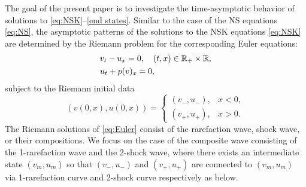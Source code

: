 \documentclass[11pt,reqno]{amsart}
\begin{document}
The goal of the present paper is to investigate the time-asymptotic behavior of solutions to \eqref{eq:NSK}--\eqref{end states}. Similar to the case of the NS equations \eqref{eq:NS}, the asymptotic patterns of the solutions to the NSK equations \eqref{eq:NSK} are determined by the Riemann problem for the corresponding Euler equations:
\begin{equation}\label{eq:Euler}
\begin{aligned}
&v_t-u_x=0,\quad (t,x)\in\mathbb R_+\times\mathbb R,\\
&u_t+p(v)_x=0,
\end{aligned}
\end{equation}
subject to the Riemann initial data
\begin{equation}\label{Riemann-data}
(v(0,x),u(0,x))=
\begin{cases} 
(v_-,u_-), &x<0,\\
(v_+,u_+), &x>0.
\end{cases}
\end{equation}
The Riemann solutions of \eqref{eq:Euler} consist of the rarefaction wave, shock wave, or their compositions. We focus on the case of the composite wave consisting of the 1-rarefaction wave and the 2-shock wave, where there exists an intermediate state $(v_m,u_m)$ so that $(v_-,u_-)$ and $(v_+,u_+)$ are connected to $(v_m,u_m)$ via 1-rarefaction curve and 2-shock curve respectively as below. %
\end{document}
